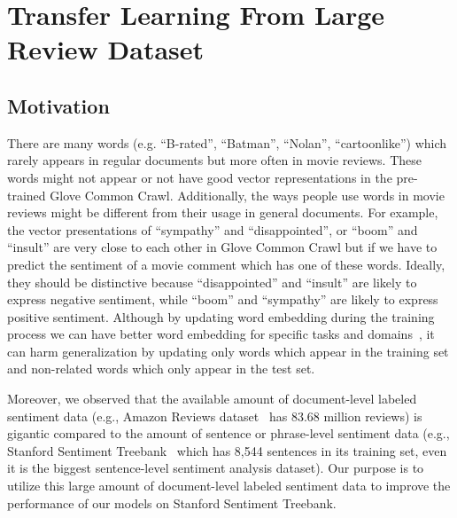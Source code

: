 \section{Transfer Learning From Large Review Dataset}
\subsection{Motivation}\label{sec:we-motive}
There are many words (e.g. ``B-rated'', ``Batman'', ``Nolan'', ``cartoonlike'') which rarely appears in regular documents but more often in movie reviews.
These words might not appear or not have good vector representations in the pre-trained Glove Common Crawl.
Additionally, the ways people use words in movie reviews might be different from their usage in general documents.
For example, the vector presentations of ``sympathy'' and ``disappointed'', or ``boom'' and ``insult'' are very close to each other in Glove Common Crawl but if we have to predict the sentiment of a movie comment which has one of these words.
Ideally, they should be distinctive because ``disappointed'' and ``insult'' are likely to express negative sentiment, while ``boom'' and ``sympathy'' are likely to express positive sentiment.
Although by updating word embedding during the training process we can have better word embedding for specific tasks and domains~\cite{treeLSTM, KimCNN}, it can harm generalization by updating only words which appear in the training set and non-related words which only appear in the test set. 
%  
% 
% 
 
Moreover, we observed that the available amount of document-level labeled sentiment data (e.g., Amazon Reviews dataset~\cite{amazon-reviews} has 83.68 million reviews) is gigantic compared to the amount of sentence or phrase-level sentiment data (e.g., Stanford Sentiment Treebank~\cite{socher2013recursive} which has 8,544 sentences in its training set, even it is the biggest sentence-level sentiment analysis dataset). 
Our purpose is to utilize this large amount of document-level labeled sentiment data to improve the performance of our models on Stanford Sentiment Treebank. 
 
%


